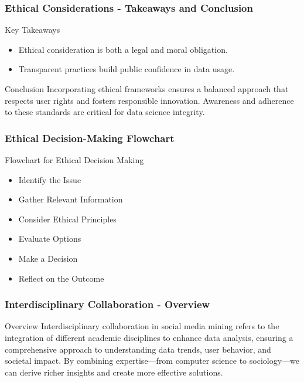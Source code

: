 \documentclass{beamer}
\begin{document}
\begin{frame}[fragile]
    \frametitle{Ethical Considerations - Takeaways and Conclusion}
    \begin{block}{Key Takeaways}
        \begin{itemize}
            \item Ethical consideration is both a legal and moral obligation.
            \item Transparent practices build public confidence in data usage.
        \end{itemize}
    \end{block}

    \begin{block}{Conclusion}
        Incorporating ethical frameworks ensures a balanced approach that respects user rights and fosters responsible innovation. Awareness and adherence to these standards are critical for data science integrity.
    \end{block}
\end{frame}

\begin{frame}[fragile]
    \frametitle{Ethical Decision-Making Flowchart}
    \begin{block}{Flowchart for Ethical Decision Making}
        \begin{itemize}
            \item Identify the Issue
            \item Gather Relevant Information
            \item Consider Ethical Principles
            \item Evaluate Options
            \item Make a Decision
            \item Reflect on the Outcome
        \end{itemize}
    \end{block}
\end{frame}

\begin{frame}[fragile]
    \frametitle{Interdisciplinary Collaboration - Overview}
    \begin{block}{Overview}
        Interdisciplinary collaboration in social media mining refers to the integration of different academic disciplines to enhance data analysis, ensuring a comprehensive approach to understanding data trends, user behavior, and societal impact. By combining expertise—from computer science to sociology—we can derive richer insights and create more effective solutions.
    \end{block}
\end{frame}
\end{document}
